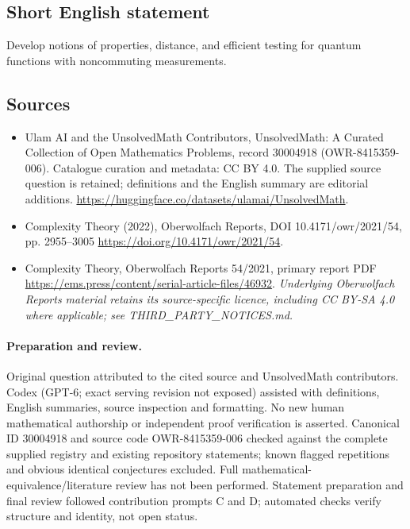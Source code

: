 \documentclass[11pt]{article}
\begin{document}
\subsection{Short English statement}
Develop notions of properties, distance, and efficient testing for quantum functions with noncommuting measurements.
\subsection{Sources}
\begin{itemize}
\item[\hypertarget{source:30004918:1}{S1}] Ulam AI and the UnsolvedMath Contributors, UnsolvedMath: A Curated Collection of Open Mathematics Problems, record 30004918 (OWR-8415359-006). Catalogue curation and metadata: CC BY 4.0. The supplied source question is retained; definitions and the English summary are editorial additions.
\url{https://huggingface.co/datasets/ulamai/UnsolvedMath}.
\item[\hypertarget{source:30004918:2}{S2}] Complexity Theory (2022), Oberwolfach Reports, DOI 10.4171/owr/2021/54, pp. 2955--3005
\url{https://doi.org/10.4171/owr/2021/54}.
\item[\hypertarget{source:30004918:3}{S3}] Complexity Theory, Oberwolfach Reports 54/2021, primary report PDF
\url{https://ems.press/content/serial-article-files/46932}.
\textit{Underlying Oberwolfach Reports material retains its source-specific licence, including CC BY-SA 4.0 where applicable; see THIRD\_PARTY\_NOTICES.md.}
\end{itemize}
\paragraph{Preparation and review.}
Original question attributed to the cited source and UnsolvedMath contributors. Codex (GPT-6; exact serving revision not exposed) assisted with definitions, English summaries, source inspection and formatting. No new human mathematical authorship or independent proof verification is asserted. Canonical ID 30004918 and source code OWR-8415359-006 checked against the complete supplied registry and existing repository statements; known flagged repetitions and obvious identical conjectures excluded. Full mathematical-equivalence/literature review has not been performed. Statement preparation and final review followed contribution prompts C and D; automated checks verify structure and identity, not open status.
\label{end:30004918}
\end{document}
